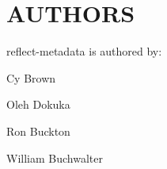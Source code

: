 \chapter{AUTHORS}
\hypertarget{md__d_1_2_g_i_t_2_food_link_2foodlink_8client_2node__modules_2reflect-metadata_2_a_u_t_h_o_r_s}{}\label{md__d_1_2_g_i_t_2_food_link_2foodlink_8client_2node__modules_2reflect-metadata_2_a_u_t_h_o_r_s}
reflect-\/metadata is authored by\+:
\begin{DoxyItemize}
\item Cy Brown
\item Oleh Dokuka
\item Ron Buckton
\item William Buchwalter 
\end{DoxyItemize}